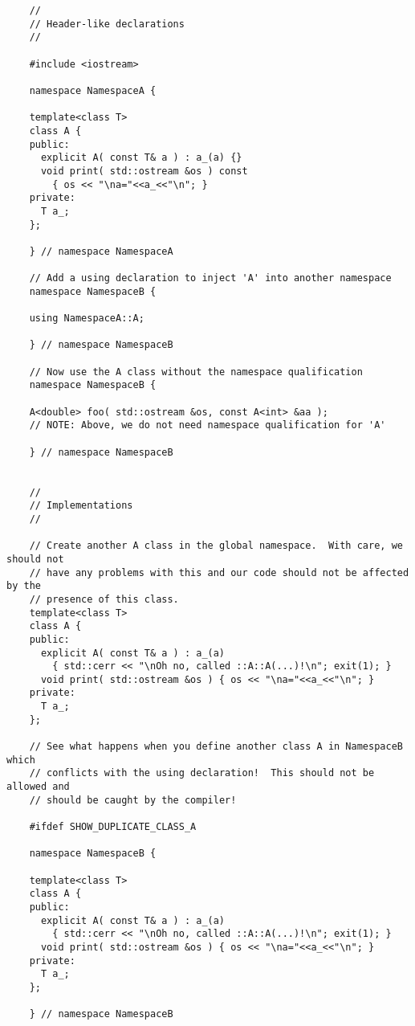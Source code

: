 {\small\begin{verbatim}
    //
    // Header-like declarations
    //
    
    #include <iostream>
    
    namespace NamespaceA {
    
    template<class T>
    class A {
    public:
      explicit A( const T& a ) : a_(a) {}
      void print( std::ostream &os ) const
        { os << "\na="<<a_<<"\n"; }
    private:
      T a_;
    };
    
    } // namespace NamespaceA
    
    // Add a using declaration to inject 'A' into another namespace
    namespace NamespaceB {
    
    using NamespaceA::A;
    
    } // namespace NamespaceB
    
    // Now use the A class without the namespace qualification
    namespace NamespaceB {
    
    A<double> foo( std::ostream &os, const A<int> &aa );
    // NOTE: Above, we do not need namespace qualification for 'A'
    
    } // namespace NamespaceB
    
    
    //
    // Implementations
    //
    
    // Create another A class in the global namespace.  With care, we should not
    // have any problems with this and our code should not be affected by the
    // presence of this class.
    template<class T>
    class A {
    public:
      explicit A( const T& a ) : a_(a) 
        { std::cerr << "\nOh no, called ::A::A(...)!\n"; exit(1); }
      void print( std::ostream &os ) { os << "\na="<<a_<<"\n"; }
    private:
      T a_;
    };
    
    // See what happens when you define another class A in NamespaceB which
    // conflicts with the using declaration!  This should not be allowed and
    // should be caught by the compiler!
    
    #ifdef SHOW_DUPLICATE_CLASS_A
    
    namespace NamespaceB {
    
    template<class T>
    class A {
    public:
      explicit A( const T& a ) : a_(a) 
        { std::cerr << "\nOh no, called ::A::A(...)!\n"; exit(1); }
      void print( std::ostream &os ) { os << "\na="<<a_<<"\n"; }
    private:
      T a_;
    };
    
    } // namespace NamespaceB
    

\end{verbatim}}
